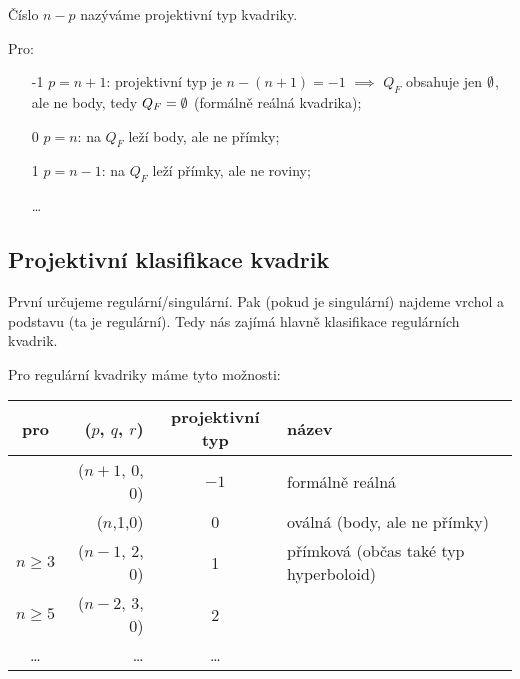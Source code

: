 \documentclass[12pt]{article}					%
\begin{document}
\begin{definice}
	Číslo $n - p$ nazýváme projektivní typ kvadriky.
\end{definice}

\begin{priklady}
	Pro:
	\begin{itemize}
		\item[-1] $p = n+1$: projektivní typ je $n - (n+1) = -1$ $\implies$ $Q_F$ obsahuje jen $\emptyset$, ale ne body, tedy $Q_F = \emptyset$ (formálně reálná kvadrika);
		\item[0] $p = n$: na $Q_F$ leží body, ale ne přímky;
		\item[1] $p = n-1$: na $Q_F$ leží přímky, ale ne roviny;
		\item[\ldots]
	\end{itemize}
\end{priklady}

\subsection{Projektivní klasifikace kvadrik}
\begin{poznamka}
	První určujeme regulární/singulární. Pak (pokud je singulární) najdeme vrchol a podstavu (ta je regulární). Tedy nás zajímá hlavně klasifikace regulárních kvadrik.
\end{poznamka}

\begin{definice}
	Pro regulární kvadriky máme tyto možnosti:\\[-2em]
	\begin{center}
	\begin{tabular}{cr|cl}
		pro     & ($p$, $q$, $r$) & projektivní typ & název                                 \\ \hline
        		& ($n+1$, 0, 0)   & $-1$            & formálně reálná                       \\
		        & ($n$,1,0)       & 0               & oválná (body, ale ne přímky)          \\
		$n ≥ 3$ & ($n-1$, 2, 0)   & 1               & přímková (občas také typ hyperboloid) \\
		$n ≥ 5$ & ($n-2$, 3, 0)   & 2               &                                       \\
		…       & …               & …               &
	\end{tabular}
	\end{center}
\end{definice}
\end{document}
